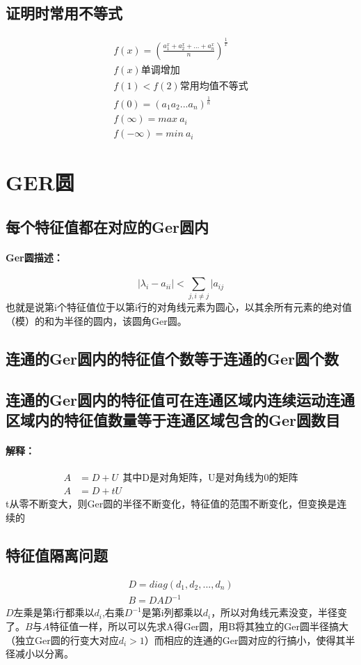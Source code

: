 \documentclass[12pt]{article}
\begin{document}
\begin{CJK*}{UTF8}{gbsn}
\subsection{证明时常用不等式}
\begin{align*}
	f(x)=(\frac{a_1^x+a_2^x+...+a_n^x}{n})^{\frac{1}{x}}\\
	f(x)\mbox{单调增加}\\
	f(1)<f(2)\mbox{常用均值不等式}\\
	f(0)={(a_1a_2...a_n)}^{\frac{1}{n}}\\
	f(\infty)=max~a_i\\
	f(-\infty)=min~a_i
\end{align*}

\section{GER圆}
\subsection{每个特征值都在对应的Ger圆内}
\paragraph{Ger圆描述：}
\begin{equation}
	|\lambda_i-a_{ii}|<\sum_{j,i\neq j}|a_{ij}
\end{equation}
也就是说第i个特征值位于以第i行的对角线元素为圆心，以其余所有元素的绝对值（模）的和为半径的圆内，该圆角Ger圆。
\subsection{连通的Ger圆内的特征值个数等于连通的Ger圆个数}
\subsection{连通的Ger圆内的特征值可在连通区域内连续运动连通区域内的特征值数量等于连通区域包含的Ger圆数目}
\paragraph{解释：}
\begin{align*}
	A&=D+U~~\mbox{其中D是对角矩阵，U是对角线为0的矩阵}\\
	A&=D+tU
\end{align*}
t从零不断变大，则Ger圆的半径不断变化，特征值的范围不断变化，但变换是连续的


\subsection{特征值隔离问题}
\begin{align*}
	D=diag(d_1,d_2,...,d_n)\\
	B=DAD^{-1}
\end{align*}
$D$左乘是第i行都乘以$d_i$,右乘$D^{-1}$是第i列都乘以$d_i$，所以对角线元素没变，半径变了。$B$与$A$特征值一样，所以可以先求A得Ger圆，用B将其独立的Ger圆半径搞大（独立Ger圆的行变大对应$d_i>1$）而相应的连通的Ger圆对应的行搞小，使得其半径减小以分离。

\end{CJK*}
\end{document}
